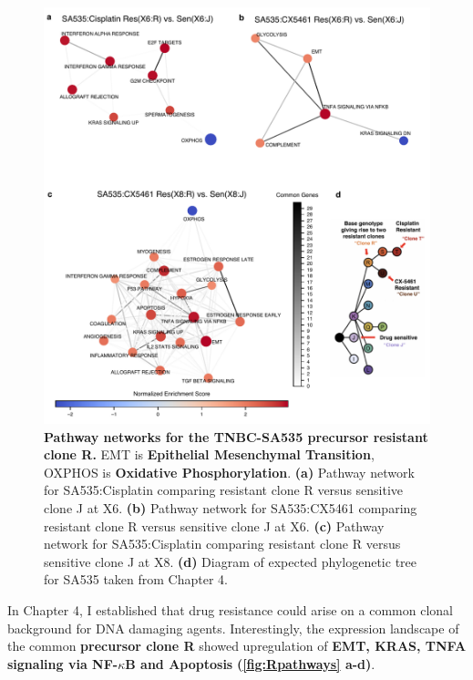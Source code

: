 \begin{figure}
\centering
 \includegraphics[width=\textwidth]{Figures/chap5/fig18_Rclone_pathways.pdf}
\caption[Pathway networks for the TNBC-SA535 precursor resistant clone.]
	{\small
	 \textbf{Pathway networks for the TNBC-SA535 precursor resistant clone R.} EMT is \textbf{Epithelial Mesenchymal Transition}, OXPHOS is \textbf{Oxidative Phosphorylation}. \textbf{(a)} Pathway network for SA535:Cisplatin comparing resistant clone R versus sensitive clone J at X6. \textbf{(b)} Pathway network for SA535:CX5461 comparing resistant clone R versus sensitive clone J at X6. \textbf{(c)} Pathway network for SA535:Cisplatin comparing resistant clone R versus sensitive clone J at X8. \textbf{(d)} Diagram of expected phylogenetic tree for SA535 taken from Chapter 4.
	 }

	\label{fig:Rpathways}
\end{figure}
In Chapter 4, I established that drug resistance could arise on a common clonal background for DNA damaging agents. Interestingly, the expression landscape of the common \textbf{precursor clone R}  showed upregulation  of \textbf{EMT, KRAS, TNFA signaling via NF-$\kappa$B and Apoptosis} \textbf{(\autoref{fig:Rpathways} a-d)}.

